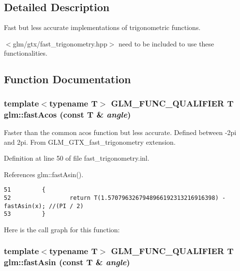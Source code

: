 \subsection{Detailed Description}
Fast but less accurate implementations of trigonometric functions. 

$<$glm/gtx/fast\_\-trigonometry.hpp$>$ need to be included to use these functionalities. 

\subsection{Function Documentation}
\hypertarget{group__gtx__fast__trigonometry_g7f5301bad6bd3a073be8882ac1f4f5d4}{
\subsubsection[fastAcos]{\setlength{\rightskip}{0pt plus 5cm}template$<$typename T$>$ GLM\_\-FUNC\_\-QUALIFIER T glm::fastAcos (const T \& {\em angle})}}
\label{group__gtx__fast__trigonometry_g7f5301bad6bd3a073be8882ac1f4f5d4}


Faster than the common acos function but less accurate. Defined between -2pi and 2pi. From GLM\_\-GTX\_\-fast\_\-trigonometry extension. 

Definition at line 50 of file fast\_\-trigonometry.inl.

References glm::fastAsin().

\begin{Code}\begin{verbatim}51         {
52                 return T(1.5707963267948966192313216916398) - fastAsin(x); //(PI / 2)
53         }
\end{verbatim}
\end{Code}




Here is the call graph for this function:\hypertarget{group__gtx__fast__trigonometry_g8c49efe243e7ad6ed58a3bcf07b560a0}{
\subsubsection[fastAsin]{\setlength{\rightskip}{0pt plus 5cm}template$<$typename T$>$ GLM\_\-FUNC\_\-QUALIFIER T glm::fastAsin (const T \& {\em angle})}}
\label{group__gtx__fast__trigonometry_g8c49efe243e7ad6ed58a3bcf07b560a0}


